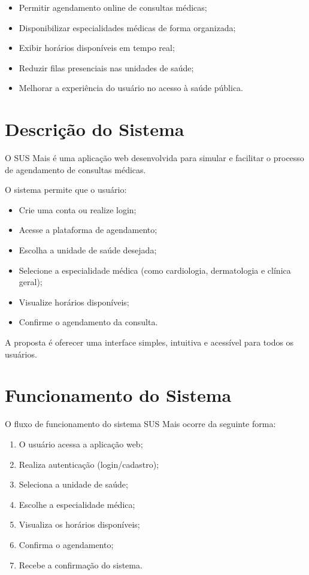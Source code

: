 \documentclass[12pt,a4paper]{article}
\begin{document}
\begin{itemize}
    \item Permitir agendamento online de consultas médicas;
    \item Disponibilizar especialidades médicas de forma organizada;
    \item Exibir horários disponíveis em tempo real;
    \item Reduzir filas presenciais nas unidades de saúde;
    \item Melhorar a experiência do usuário no acesso à saúde pública.
\end{itemize}

\section{Descrição do Sistema}

O SUS Mais é uma aplicação web desenvolvida para simular e facilitar o processo de agendamento de consultas médicas.

O sistema permite que o usuário:

\begin{itemize}
    \item Crie uma conta ou realize login;
    \item Acesse a plataforma de agendamento;
    \item Escolha a unidade de saúde desejada;
    \item Selecione a especialidade médica (como cardiologia, dermatologia e clínica geral);
    \item Visualize horários disponíveis;
    \item Confirme o agendamento da consulta.
\end{itemize}

A proposta é oferecer uma interface simples, intuitiva e acessível para todos os usuários.

\section{Funcionamento do Sistema}

O fluxo de funcionamento do sistema SUS Mais ocorre da seguinte forma:

\begin{enumerate}
    \item O usuário acessa a aplicação web;
    \item Realiza autenticação (login/cadastro);
    \item Seleciona a unidade de saúde;
    \item Escolhe a especialidade médica;
    \item Visualiza os horários disponíveis;
    \item Confirma o agendamento;
    \item Recebe a confirmação do sistema.
\end{enumerate}
\end{document}
